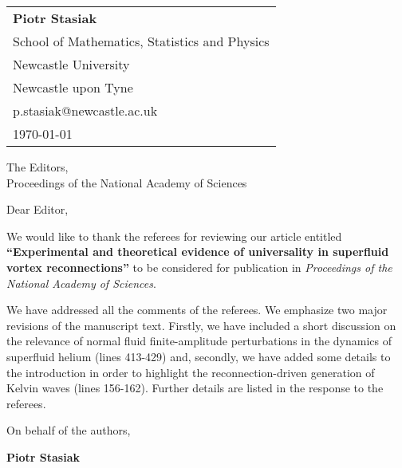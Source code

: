\documentclass[a4paper,10pt]{letter}
\begin{document}
\begin{flushright}
    \begin{tabular}{l}
        \textbf{Piotr Stasiak} \\
        School of Mathematics, Statistics and Physics\\
        Newcastle University \\
        Newcastle  upon Tyne \\
        p.stasiak@newcastle.ac.uk \\
        \today
    \end{tabular}
\end{flushright}

\vspace{1cm}

The Editors,\\
Proceedings of the National Academy of Sciences\\


\vspace{1cm}

Dear Editor,

\vspace{0.5cm}

We would like to thank the referees for reviewing our article entitled
\textbf{``Experimental and theoretical evidence of universality 
in superfluid vortex reconnections''} to be
considered for publication in \textit{Proceedings of the National Academy of Sciences}. \vspace{0.5cm}

We have addressed all the comments of the referees. We emphasize two major revisions of the manuscript text. Firstly, we have included a short discussion on the relevance of normal fluid finite-amplitude perturbations in the dynamics of superfluid helium (lines 413-429) and, secondly, we have added some details to the introduction in order to highlight the reconnection-driven generation of Kelvin waves (lines 156-162). Further details are listed in the response to the referees.

\vspace{0.5cm}

On behalf of the authors,

\vspace{1cm}

\textbf{Piotr Stasiak}
\end{document}
